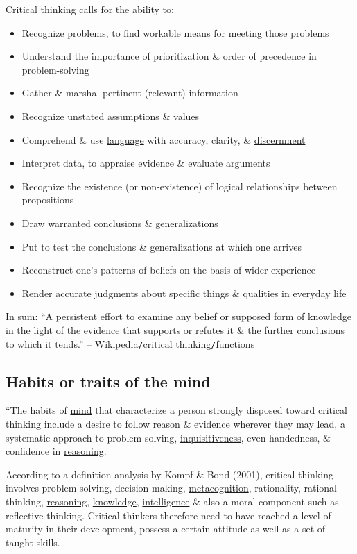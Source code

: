 \documentclass[oneside]{book}
\numberwithin{equation}{section}
\begin{document}
Critical thinking calls for the ability to:
\begin{itemize}
	\item Recognize problems, to find workable means for meeting those problems
	\item Understand the importance of prioritization \& order of precedence in problem-solving
	\item Gather \& marshal pertinent (relevant) information
	\item Recognize \href{https://en.wikipedia.org/wiki/Unstated_assumption}{unstated assumptions} \& values
	\item Comprehend \& use \href{https://en.wikipedia.org/wiki/Language}{language} with accuracy, clarity, \& \href{https://en.wiktionary.org/wiki/discernment}{discernment}
	\item Interpret data, to appraise evidence \& evaluate arguments
	\item Recognize the existence (or non-existence) of logical relationships between propositions
	\item Draw warranted conclusions \& generalizations
	\item Put to test the conclusions \& generalizations at which one arrives
	\item Reconstruct one's patterns of beliefs on the basis of wider experience
	\item Render accurate judgments about specific things \& qualities in everyday life
\end{itemize}
In sum: ``A persistent effort to examine any belief or supposed form of knowledge in the light of the evidence that supports or refutes it \& the further conclusions to which it tends.'' -- \href{https://en.wikipedia.org/wiki/Critical_thinking#Functions}{Wikipedia\texttt{/}critical thinking\texttt{/}functions}

\subsection{Habits or traits of the mind}
``The habits of \href{https://en.wikipedia.org/wiki/Mind}{mind} that characterize a person strongly disposed toward critical thinking include a desire to follow reason \& evidence wherever they may lead, a systematic approach to problem solving, \href{https://en.wikipedia.org/wiki/Inquisitiveness}{inquisitiveness}, even-handedness, \& confidence in \href{https://en.wikipedia.org/wiki/Reasoning}{reasoning}.

According to a definition analysis by Kompf \& Bond (2001), critical thinking involves problem solving, decision making, \href{https://en.wikipedia.org/wiki/Metacognition}{metacognition}, rationality, rational thinking, \href{https://en.wikipedia.org/wiki/Reasoning}{reasoning}, \href{https://en.wikipedia.org/wiki/Knowledge}{knowledge}, \href{https://en.wikipedia.org/wiki/Intelligence}{intelligence} \& also a moral component such as reflective thinking. Critical thinkers therefore need to have reached a level of maturity in their development, possess a certain attitude as well as a set of taught skills.
\end{document}
